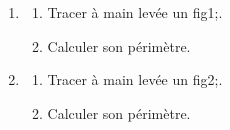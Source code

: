 \documentclass[exercice]{thedocument}%
\begin{document}
%
\begin{enumerate}
    \item\begin{enumerate}
        \item Tracer à main levée un \<fig1;.
        \item Calculer son périmètre.
    \end{enumerate}
    \item\begin{enumerate}
        \item Tracer à main levée un \<fig2;.
        \item Calculer son périmètre.
    \end{enumerate}
\end{enumerate}
\end{document}
